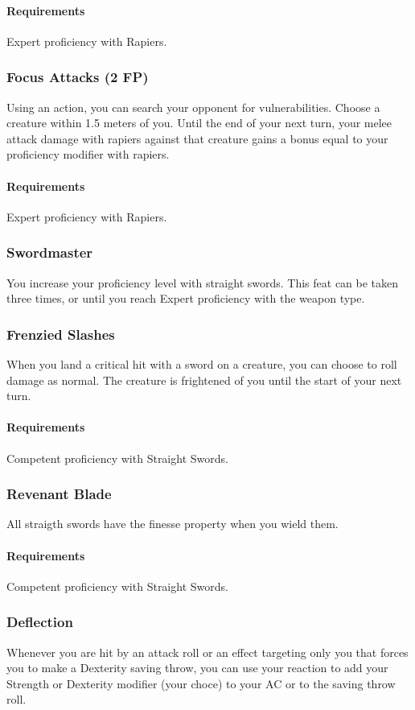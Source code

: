     \paragraph{Requirements} Expert proficiency with Rapiers.
\subsubsection{Focus Attacks (2 FP)} \label{feat::focusattacks}
    Using an action, you can search your opponent for vulnerabilities.
    Choose a creature within 1.5 meters of you.
    Until the end of your next turn, your melee attack damage with rapiers against that creature gains a bonus equal to your proficiency modifier with rapiers.
    \paragraph{Requirements} Expert proficiency with Rapiers.
\subsubsection{Swordmaster} \label{feat::swordmaster}
    You increase your proficiency level with straight swords.
    This feat can be taken three times, or until you reach Expert proficiency with the weapon type.
\subsubsection{Frenzied Slashes} \label{feat::frenziedslashes}
    When you land a critical hit with a sword on a creature, you can choose to roll damage as normal.
    The creature is frightened of you until the start of your next turn.
    \paragraph{Requirements} Competent proficiency with Straight Swords.
\subsubsection{Revenant Blade} \label{feat::revenantblade}
    All straigth swords have the finesse property when you wield them.
    \paragraph{Requirements} Competent proficiency with Straight Swords.
\subsubsection{Deflection} \label{feat::deflection}
    Whenever you are hit by an attack roll or an effect targeting only you that forces you to make a Dexterity saving throw, you can use your reaction to add your Strength or Dexterity modifier (your choce) to your AC or to the saving throw roll.
